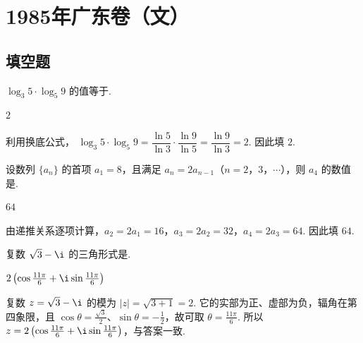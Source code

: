 \documentclass[UTF8,a4paper,oneside,11pt]{ctexbook}
\begin{document}
\mainmatter

\chapter{1985年广东卷（文）}

\section{填空题}

\begin{problem}

\(\log_{3}5\cdot\log_{5}9 \) 的值等于\fillinblank{}.
\begin{answer}
\(2\)
\end{answer}

\begin{solution}
利用换底公式，
\(\log_{3}5\cdot\log_{5}9=\dfrac{\ln5}{\ln3}\cdot\dfrac{\ln9}{\ln5}=\dfrac{\ln9}{\ln3}=2\). 因此填 \(2\).
\end{solution}
\end{problem}

\begin{problem}

设数列 \(\{a_{n}\}\) 的首项 \(a_{1} = 8\)，且满足 \(a_{n} = 2a_{n-1}\)（\(n = 2\)，\(3\)，\(\cdots\)），则 \(a_{4}\) 的数值是\fillinblank{}.
\begin{answer}
\(64\)
\end{answer}

\begin{solution}
由递推关系逐项计算，\(a_{2}=2a_{1}=16\)，\(a_{3}=2a_{2}=32\)，\(a_{4}=2a_{3}=64\). 因此填 \(64\).
\end{solution}
\end{problem}

\begin{problem}

复数 \(\sqrt{3}-\i \) 的三角形式是\fillinblank{}.
\begin{answer}
\(2\left(\cos\frac{11\pi}{6}+\i\sin\frac{11\pi}{6}\right)\)
\end{answer}

\begin{solution}
复数 \(z=\sqrt3-\i\) 的模为 \(|z|=\sqrt{3+1}=2\). 它的实部为正、虚部为负，辐角在第四象限，且 \(\cos\theta=\frac{\sqrt3}{2}\)、\(\sin\theta=-\frac12\)，故可取 \(\theta=\frac{11\pi}{6}\). 所以
\(z=2\left(\cos\frac{11\pi}{6}+\i\sin\frac{11\pi}{6}\right)\)，与答案一致.
\end{solution}
\end{problem}
\end{document}

